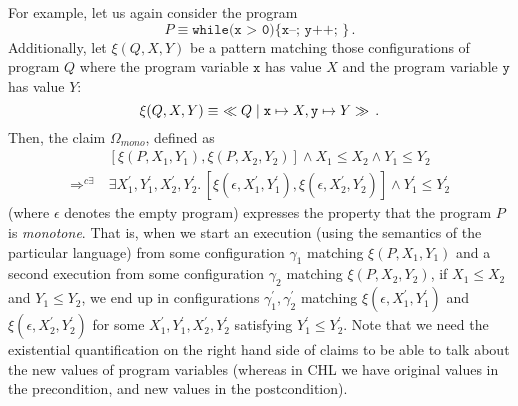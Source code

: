 For example, let us again consider the program
\begin{equation*}
  P \equiv \texttt{while(x > 0)\{ x--; y++; \}} \, .
\end{equation*}
Additionally, let $\xi(Q, X, Y)$ be a pattern matching those configurations of
program $Q$ where the program variable $\texttt{x}$ has value $X$ and the program
variable $\texttt{y}$ has value $Y$:
\begin{equation}\label{eqn:CQXY}
 \xi(Q, X, Y) \equiv\ \ll\texttt{$Q$} \mid \texttt{x}\mapsto X, \texttt{y}\mapsto Y \gg  \, .
\end{equation}
Then, the claim $\Omega_{\textit{mono}}$, defined as
\begin{align*}
&[\xi(P, X_1, Y_1),\xi(P, X_2, Y_2)] \land X_1 \leq X_2 \land Y_1 \leq Y_2
\\ \Rightarrow^{c\exists}\ &
\exists X^\prime_1, Y^\prime_1, X^\prime_2, Y^\prime_2.\,  [\xi(\epsilon, X^\prime_1, Y^\prime_1), \xi(\epsilon, X^\prime_2, Y^\prime_2)] \land Y^\prime_1 \leq Y^\prime_2   
\end{align*}
(where $\epsilon$ denotes the empty program)
expresses the property that the program $P$ is \emph{monotone}.
That is, when we start an execution (using the semantics of the particular language)
from some configuration $\gamma_1$ matching $\xi(P, X_1, Y_1)$
and a second execution from some configuration $\gamma_2$ matching $\xi(P, X_2, Y_2)$,
if $X_1 \leq X_2$ and $Y_1 \leq Y_2$,
we end up in configurations $\gamma_1^\prime,\gamma_2^\prime$ matching
$\xi(\epsilon, X^\prime_1, Y^\prime_1)$ and $\xi(\epsilon, X^\prime_2, Y^\prime_2)$
for some $X^\prime_1,Y^\prime_1,X^\prime_2,Y^\prime_2$
satisfying $Y^\prime_1 \leq Y^\prime_2$.
%
Note that we need the existential quantification on the right hand side of
claims to be able to talk about the new values of program variables (whereas
in CHL we have original values in the precondition, and new values in the postcondition).


